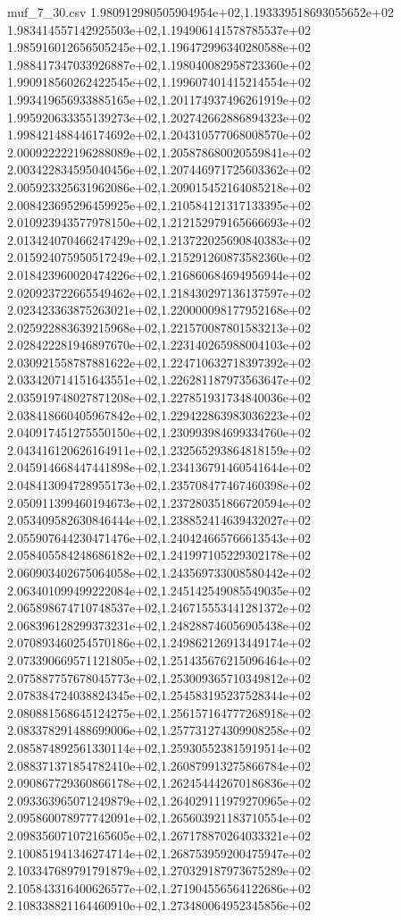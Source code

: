 \begin{filecontents*}{muf_7_30.csv}
1.980912980505904954e+02,1.193339518693055652e+02
1.983414557142925503e+02,1.194906141578785537e+02
1.985916012656505245e+02,1.196472996340280588e+02
1.988417347033926887e+02,1.198040082958723360e+02
1.990918560262422545e+02,1.199607401415214554e+02
1.993419656933885165e+02,1.201174937496261919e+02
1.995920633355139273e+02,1.202742662886894323e+02
1.998421488446174692e+02,1.204310577068008570e+02
2.000922222196288089e+02,1.205878680020559841e+02
2.003422834595040456e+02,1.207446971725603362e+02
2.005923325631962086e+02,1.209015452164085218e+02
2.008423695296459925e+02,1.210584121317133395e+02
2.010923943577978150e+02,1.212152979165666693e+02
2.013424070466247429e+02,1.213722025690840383e+02
2.015924075950517249e+02,1.215291260873582360e+02
2.018423960020474226e+02,1.216860684694956944e+02
2.020923722665549462e+02,1.218430297136137597e+02
2.023423363875263021e+02,1.220000098177952168e+02
2.025922883639215968e+02,1.221570087801583213e+02
2.028422281946897670e+02,1.223140265988004103e+02
2.030921558787881622e+02,1.224710632718397392e+02
2.033420714151643551e+02,1.226281187973563647e+02
2.035919748027871208e+02,1.227851931734840036e+02
2.038418660405967842e+02,1.229422863983036223e+02
2.040917451275550150e+02,1.230993984699334760e+02
2.043416120626164911e+02,1.232565293864818159e+02
2.045914668447441898e+02,1.234136791460541644e+02
2.048413094728955173e+02,1.235708477467460398e+02
2.050911399460194673e+02,1.237280351866720594e+02
2.053409582630846444e+02,1.238852414639432027e+02
2.055907644230471476e+02,1.240424665766613543e+02
2.058405584248686182e+02,1.241997105229302178e+02
2.060903402675064058e+02,1.243569733008580442e+02
2.063401099499222084e+02,1.245142549085549035e+02
2.065898674710748537e+02,1.246715553441281372e+02
2.068396128299373231e+02,1.248288746056905438e+02
2.070893460254570186e+02,1.249862126913449174e+02
2.073390669571121805e+02,1.251435676215096464e+02
2.075887757678045773e+02,1.253009365710349812e+02
2.078384724038824345e+02,1.254583195237528344e+02
2.080881568645124275e+02,1.256157164777268918e+02
2.083378291488699006e+02,1.257731274309908258e+02
2.085874892561330114e+02,1.259305523815919514e+02
2.088371371854782410e+02,1.260879913275866784e+02
2.090867729360866178e+02,1.262454442670186836e+02
2.093363965071249879e+02,1.264029111979270965e+02
2.095860078977742091e+02,1.265603921183710554e+02
2.098356071072165605e+02,1.267178870264033321e+02
2.100851941346274714e+02,1.268753959200475947e+02
2.103347689791791879e+02,1.270329187973675289e+02
2.105843316400626577e+02,1.271904556564122686e+02
2.108338821164460910e+02,1.273480064952345856e+02

\end{filecontents*}
